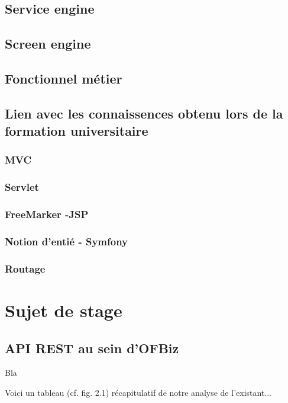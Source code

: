 \subsection{Service engine}
\subsection{Screen engine}
\subsection{Fonctionnel métier}
\subsection{Lien avec les connaissences obtenu lors de la formation universitaire}
\subsubsection{MVC}
\subsubsection{Servlet}
\subsubsection{FreeMarker -JSP}
\subsubsection{Notion d'entié - Symfony}
\subsubsection{Routage}

\section{Sujet de stage }



\subsection{API REST au sein d'OFBiz}
\iffalse
Bla


Voici un tableau (cf. fig. 2.1) récapitulatif de notre analyse de l'existant...\\

